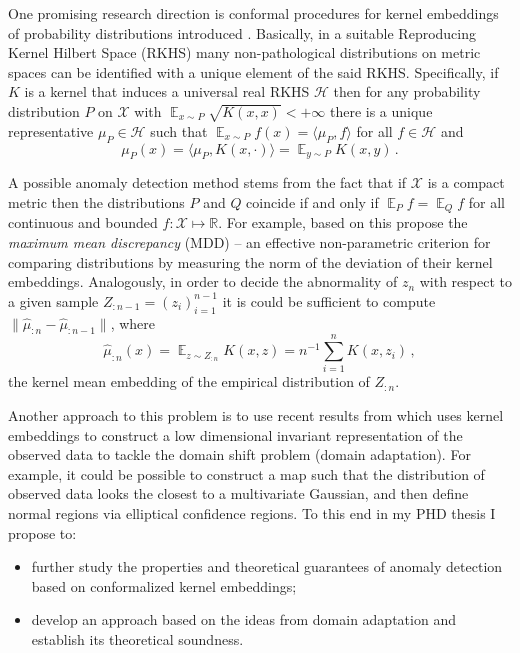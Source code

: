 \documentclass{extarticle}
\newcommand{\ex}{\mathop{\mathbb{E}}\nolimits}
\newcommand{\Hcal}{\mathcal{H}}
\newcommand{\Xcal}{\mathcal{X}}
\newcommand{\Real}{\mathbb{R}}
\begin{document}
One promising research direction is conformal procedures for kernel embeddings of
probability distributions introduced \cite{smola2007}. Basically, in a suitable
Reproducing Kernel Hilbert Space (RKHS) many non-pathological distributions on metric
spaces can be identified with a unique element of the said RKHS. Specifically, if
$K$ is a kernel that induces a universal real RKHS $\Hcal$ then for any probability
distribution $P$ on $\Xcal$ with $\ex_{x\sim P} \sqrt{K(x,x)} < +\infty$ there is
a unique representative $\mu_P\in \Hcal$ such that $\ex_{x\sim P} f(x) = \langle \mu_P, f\rangle$
for all $f\in \Hcal$ and
\begin{equation*}
  \mu_P(x) = \langle \mu_P, K(x, \cdot) \rangle = \ex_{y\sim P} K(x, y) \,.
\end{equation*}

A possible anomaly detection method stems from the fact that if $\Xcal$ is a compact
metric then the distributions $P$ and $Q$ coincide if and only if $\ex_P f = \ex_Q f$
for all continuous and bounded $f:\Xcal\mapsto \Real$. For example, based on this
\cite{gretton2012} propose the \textit{maximum mean discrepancy} (MDD) -- an effective
non-parametric criterion for comparing distributions by measuring the norm of the
deviation of their kernel embeddings. Analogously, in order to decide the abnormality
of $z_n$ with respect to a given sample $Z_{:n-1} = (z_i)_{i=1}^{n-1}$ it is could
be sufficient to compute $\|\hat{\mu}_{:n} - \hat{\mu}_{:n-1}\|$, where
\begin{equation*}
  \hat{\mu}_{:n}(x) = \ex_{z\sim Z_{:n}} K(x, z) = n^{-1} \sum_{i=1}^n K(x, z_i) \,,
\end{equation*}
the kernel mean embedding of the empirical distribution of $Z_{:n}$.

Another approach to this problem is to use recent results from \cite{Baktashmotlaghetal2016}
which uses kernel embeddings to construct a low dimensional invariant representation
of the observed data to tackle the domain shift problem (domain adaptation). For
example, it could be possible to construct a map such that the distribution of observed
data looks the closest to a multivariate Gaussian, and then define normal regions
via elliptical confidence regions. To this end in my PHD thesis I propose to:
\begin{itemize}
  \item further study the properties and theoretical guarantees of anomaly detection
  based on conformalized kernel embeddings;
  \item develop an approach based on the ideas from domain adaptation and establish
  its theoretical soundness.
\end{itemize}


% 
\clearpage


\end{document}
